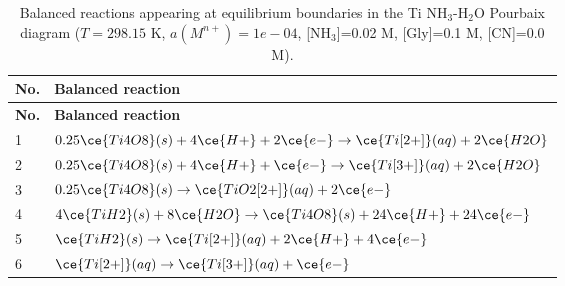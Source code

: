 \begin{longtable}{|p{0.9cm}|p{13.3cm}|}
\caption{Balanced reactions appearing at equilibrium boundaries in the Ti NH$_3$-H$_2$O Pourbaix diagram ($T=298.15$ K, $a(M^{n+})=1e-04$, [NH$_3$]=0.02 M, [Gly]=0.1 M, [CN]=0.0 M).}\\
\hline
\textbf{No.} & \textbf{Balanced reaction} \\ \hline
\endfirsthead
\hline
\textbf{No.} & \textbf{Balanced reaction} \\ \hline
\endhead
1 & $0.25 \ce{Ti4O8}(s) + 4 \ce{H+} + 2 \ce{e-} \rightarrow \ce{Ti[2+]}(aq) + 2 \ce{H2O}$ \\ \hline
2 & $0.25 \ce{Ti4O8}(s) + 4 \ce{H+} + \ce{e-} \rightarrow \ce{Ti[3+]}(aq) + 2 \ce{H2O}$ \\ \hline
3 & $0.25 \ce{Ti4O8}(s) \rightarrow \ce{TiO2[2+]}(aq) + 2 \ce{e-}$ \\ \hline
4 & $4 \ce{TiH2}(s) + 8 \ce{H2O} \rightarrow \ce{Ti4O8}(s) + 24 \ce{H+} + 24 \ce{e-}$ \\ \hline
5 & $\ce{TiH2}(s) \rightarrow \ce{Ti[2+]}(aq) + 2 \ce{H+} + 4 \ce{e-}$ \\ \hline
6 & $\ce{Ti[2+]}(aq) \rightarrow \ce{Ti[3+]}(aq) + \ce{e-}$ \\ \hline
\end{longtable}
